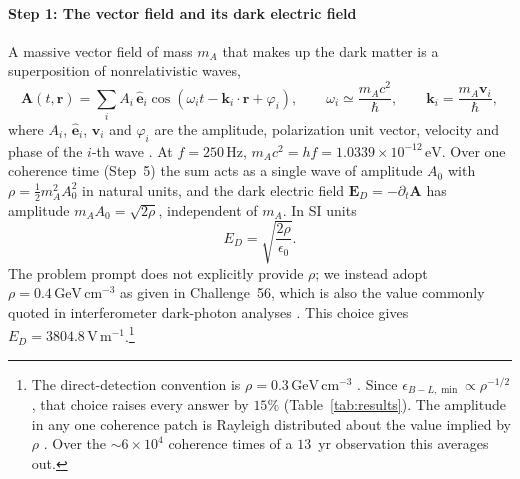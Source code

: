 \paragraph*{Step 1: The vector field and its dark electric field}
A massive vector field of mass $m_A$ that makes up the dark matter is a superposition of nonrelativistic waves,
%
\begin{equation}
\mathbf A(t,\mathbf r)=\sum_i A_i\,\hat{\mathbf e}_i\cos(\omega_it-\mathbf k_i\cdot\mathbf r+\varphi_i),\qquad \omega_i\simeq\frac{m_Ac^2}{\hbar},\qquad \mathbf k_i=\frac{m_A\mathbf v_i}{\hbar},
\label{eq:field}
\end{equation}
%
where $A_i$, $\hat{\mathbf e}_i$, $\mathbf v_i$ and $\varphi_i$ are the amplitude, polarization unit vector, velocity and phase of the $i$-th wave \citep{Pierce2018,Morisaki2021}. At $f=250\,\mathrm{Hz}$, $m_Ac^2=hf=1.0339\times10^{-12}\,\mathrm{eV}$. Over one coherence time (Step~5) the sum acts as a single wave of amplitude $A_0$ with $\rho=\tfrac12m_A^2A_0^2$ in natural units, and the dark electric field $\mathbf E_D=-\partial_t\mathbf A$ has amplitude $m_AA_0=\sqrt{2\rho}$, independent of $m_A$. In SI units
%
\begin{equation}
E_D=\sqrt{\frac{2\rho}{\epsilon_0}} .
\label{eq:ED}
\end{equation}
%
The problem prompt does not explicitly provide $\rho$; we instead adopt $\rho=0.4\,\mathrm{GeV\,cm^{-3}}$ as given in Challenge~56, which is also the value commonly quoted in interferometer dark-photon analyses \citep{Pierce2018,Guo2019,Morisaki2021}. This choice gives $E_D=3804.8\,\mathrm{V\,m^{-1}}$.\footnote{The direct-detection convention is $\rho=0.3\,\mathrm{GeV\,cm^{-3}}$ \citep{LewinSmith1996,Baxter2021}. Since $\epsilon_{B-L,\min}\propto\rho^{-1/2}$, that choice raises every answer by $15\%$ (Table~\ref{tab:results}). The amplitude in any one coherence patch is Rayleigh distributed about the value implied by $\rho$ \citep{Centers2021}. Over the $\sim6\times10^{4}$ coherence times of a $13$~yr observation this averages out.}

